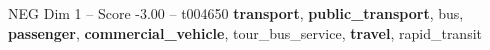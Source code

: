 \begin{textsample}{NEG Dim 1 – Score -3.00 – t004650}  \label{ex:f1_neg_033}
\textbf{transport}, \textbf{public\_transport}, bus, \textbf{passenger}, \textbf{commercial\_vehicle}, tour\_bus\_service, \textbf{travel}, rapid\_transit

\end{textsample}
